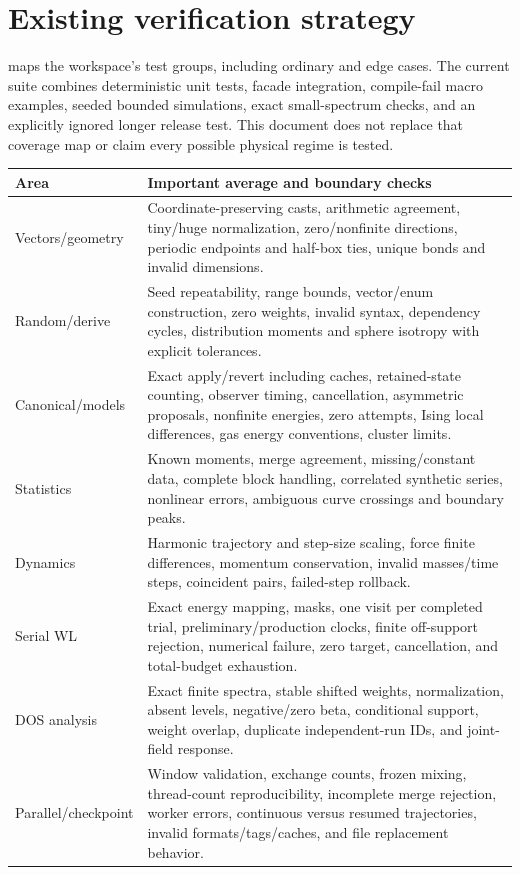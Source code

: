 \documentclass[11pt,a4paper,oneside]{report}
\begin{document}
\section{Existing verification strategy}
 maps the workspace's test groups, including ordinary and edge
cases. The current suite combines deterministic unit tests, facade integration,
compile-fail macro examples, seeded bounded simulations, exact small-spectrum
checks, and an explicitly ignored longer release test. This document does not
replace that coverage map or claim every possible physical regime is tested.

\begin{longtable}{@{}P{0.24\textwidth}P{0.70\textwidth}@{}}
\toprule Area & Important average and boundary checks\\\midrule\endhead
Vectors/geometry & Coordinate-preserving casts, arithmetic agreement, tiny/huge
normalization, zero/nonfinite directions, periodic endpoints and half-box ties,
unique bonds and invalid dimensions.\\
Random/derive & Seed repeatability, range bounds, vector/enum construction,
zero weights, invalid syntax, dependency cycles, distribution moments and sphere
isotropy with explicit tolerances.\\
Canonical/models & Exact apply/revert including caches, retained-state counting,
observer timing, cancellation, asymmetric proposals, nonfinite energies,
zero attempts, Ising local differences, gas energy conventions, cluster limits.\\
Statistics & Known moments, merge agreement, missing/constant data, complete
block handling, correlated synthetic series, nonlinear errors, ambiguous curve
crossings and boundary peaks.\\
Dynamics & Harmonic trajectory and step-size scaling, force finite differences,
momentum conservation, invalid masses/time steps, coincident pairs, failed-step
rollback.\\
Serial WL & Exact energy mapping, masks, one visit per completed trial,
preliminary/production clocks, finite off-support rejection, numerical failure,
zero target, cancellation, and total-budget exhaustion.\\
DOS analysis & Exact finite spectra, stable shifted weights, normalization,
absent levels, negative/zero beta, conditional support, weight overlap, duplicate
independent-run IDs, and joint-field response.\\
Parallel/checkpoint & Window validation, exchange counts, frozen mixing,
thread-count reproducibility, incomplete merge rejection, worker errors,
continuous versus resumed trajectories, invalid formats/tags/caches, and file
replacement behavior.\\
\bottomrule
\end{longtable}
\end{document}
